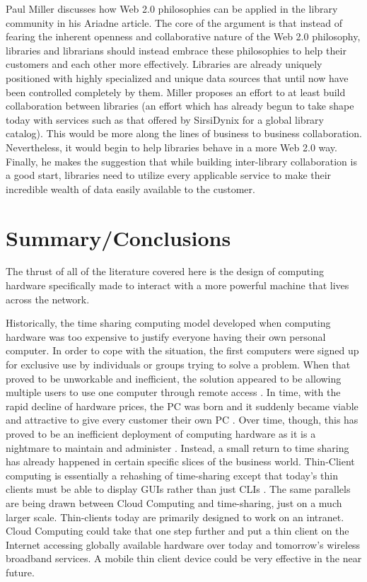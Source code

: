 Paul Miller \citeyearpar{miller2005} discusses how Web 2.0 philosophies can be
applied in the library community in his Ariadne article.  The core of the
argument is that instead of fearing the inherent openness and collaborative
nature of the Web 2.0 philosophy, libraries and librarians should instead
embrace these philosophies to help their customers and each other more
effectively.  Libraries are already uniquely positioned with highly specialized
and unique data sources that until now have been controlled completely by them.
Miller proposes an effort to at least build collaboration between libraries (an
effort which has already begun to take shape today with services such as that
offered by SirsiDynix for a global library catalog).  This would be more along
the lines of business to business collaboration.  Nevertheless, it would begin
to help libraries behave in a more Web 2.0 way.  Finally, he makes the
suggestion that while building inter-library collaboration is a good start,
libraries need to utilize every applicable service to make their incredible
wealth of data easily available to the customer.

\section{Summary/Conclusions}

The thrust of all of the literature covered here is the design of computing
hardware specifically made to interact with a more powerful machine that lives
across the network.

Historically, the time sharing computing model developed when computing hardware
was too expensive to justify everyone having their own personal computer.  In
order to cope with the situation, the first computers were signed up for
exclusive use by individuals or groups trying to solve a problem.  When that
proved to be unworkable and inefficient, the solution appeared to be allowing
multiple users to use one computer through remote access \citep{kelly2004}.  In
time, with the rapid decline of hardware prices, the PC was born and it suddenly
became viable and attractive to give every customer their own PC
\citep{kelly2004}.  Over time, though, this has proved to be an inefficient
deployment of computing hardware as it is a nightmare to maintain and administer
\citep{schmidt1999}.  Instead, a small return to time sharing has already
happened in certain specific slices of the business world.  Thin-Client
computing is essentially a rehashing of time-sharing except that today's thin
clients must be able to display GUIs rather than just CLIs \citep{schmidt1999}.
The same parallels are being drawn between Cloud Computing and time-sharing,
just on a much larger scale.  Thin-clients today are primarily designed to work
on an intranet.  Cloud Computing could take that one step further and put a thin
client on the Internet accessing globally available hardware over today and
tomorrow's wireless broadband services.  A mobile thin client device could be
very effective in the near future.


